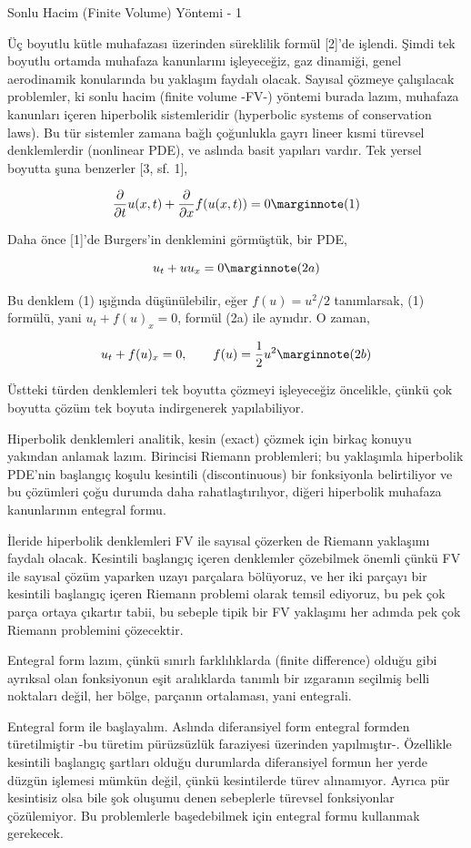 \documentclass[12pt,fleqn]{article}\usepackage{../../common}
\begin{document}
Sonlu Hacim (Finite Volume) Yöntemi - 1

Üç boyutlu kütle muhafazası üzerinden süreklilik formül [2]'de işlendi.  Şimdi
tek boyutlu ortamda muhafaza kanunlarını işleyeceğiz, gaz dinamiği, genel
aerodinamik konularında bu yaklaşım faydalı olacak. Sayısal çözmeye çalışılacak
problemler, ki sonlu hacim (finite volume -FV-) yöntemi burada lazım, muhafaza
kanunları içeren hiperbolik sistemleridir (hyperbolic systems of conservation
laws). Bu tür sistemler zamana bağlı çoğunlukla gayrı lineer kısmi türevsel
denklemlerdir (nonlinear PDE), ve aslında basit yapıları vardır. Tek yersel
boyutta şuna benzerler [3, sf. 1],

$$
\frac{\partial }{\partial t} u(x,t) + 
\frac{\partial }{\partial x} f(u(x,t)) = 0
\mlabel{1}
$$

Daha önce [1]'de Burgers'in denklemini görmüştük, bir PDE,

$$
u_t + uu_x = 0
\mlabel{2a}
$$

Bu denklem (1) ışığında düşünülebilir, eğer $f(u) = u^2/2$ tanımlarsak,
(1) formülü, yani $u_t + f(u)_x = 0$, formül (2a) ile aynıdır. O zaman,

$$
u_t + f(u)_x = 0, \qquad f(u) = \frac{1}{2}u^2
\mlabel{2b}
$$

Üstteki türden denklemleri tek boyutta çözmeyi işleyeceğiz öncelikle, çünkü çok
boyutta çözüm tek boyuta indirgenerek yapılabiliyor.

Hiperbolik denklemleri analitik, kesin (exact) çözmek için birkaç konuyu
yakından anlamak lazım. Birincisi Riemann problemleri; bu yaklaşımla hiperbolik
PDE'nin başlangıç koşulu kesintili (discontinuous) bir fonksiyonla belirtiliyor
ve bu çözümleri çoğu durumda daha rahatlaştırılıyor, diğeri hiperbolik muhafaza
kanunlarının entegral formu.

İleride hiperbolik denklemleri FV ile sayısal çözerken de Riemann yaklaşımı
faydalı olacak. Kesintili başlangıç içeren denklemler çözebilmek önemli çünkü FV
ile sayısal çözüm yaparken uzayı parçalara bölüyoruz, ve her iki parçayı bir
kesintili başlangıç içeren Riemann problemi olarak temsil ediyoruz, bu pek çok
parça ortaya çıkartır tabii, bu sebeple tipik bir FV yaklaşımı her adımda pek
çok Riemann problemini çözecektir.

Entegral form lazım, çünkü sınırlı farklılıklarda (finite difference) olduğu
gibi ayrıksal olan fonksiyonun eşit aralıklarda tanımlı bir ızgaranın seçilmiş
belli noktaları değil, her bölge, parçanın ortalaması, yani entegrali.

Entegral form ile başlayalım. Aslında diferansiyel form entegral formden
türetilmiştir -bu türetim pürüzsüzlük faraziyesi üzerinden
yapılmıştır-. Özellikle kesintili başlangıç şartları olduğu durumlarda
diferansiyel formun her yerde düzgün işlemesi mümkün değil, çünkü kesintilerde
türev alınamıyor. Ayrıca pür kesintisiz olsa bile şok oluşumu denen sebeplerle
türevsel fonksiyonlar çözülemiyor. Bu problemlerle başedebilmek için entegral
formu kullanmak gerekecek.
\end{document}
